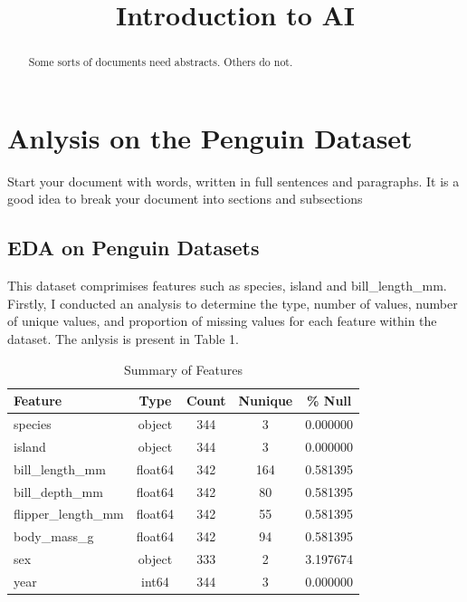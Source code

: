 \documentclass[a4paper,11pt]{article}
\theoremstyle{definition}
\begin{document}
	
\title{Introduction to AI}
\date{}
\maketitle

\begin{abstract}
Some sorts of documents need abstracts. Others do not.
\end{abstract}


\section{Anlysis on the Penguin Dataset}

Start your document with words, written in full sentences and paragraphs.
It is a good idea to break your document into sections and subsections
\subsection{EDA on Penguin Datasets}
This dataset comprimises features such as species, island and bill\_length\_mm. Firstly, I conducted an analysis 
to determine the type, number of values, number of unique values, and proportion of missing values for each feature within the dataset. The
anlysis is present in Table 1.

\begin{table}[h]
	\centering
	\caption{Summary of Features}
	\begin{tabular}{lcccc}
		\toprule
		Feature & Type & Count & Nunique & \% Null \\
		\midrule
		species & object & 344 & 3 & 0.000000 \\
		island & object & 344 & 3 & 0.000000 \\
		bill\_length\_mm & float64 & 342 & 164 & 0.581395 \\
		bill\_depth\_mm & float64 & 342 & 80 & 0.581395 \\
		flipper\_length\_mm & float64 & 342 & 55 & 0.581395 \\
		body\_mass\_g & float64 & 342 & 94 & 0.581395 \\
		sex & object & 333 & 2 & 3.197674 \\
		year & int64 & 344 & 3 & 0.000000 \\
		\bottomrule
	\end{tabular}
\end{table}
\end{document}
